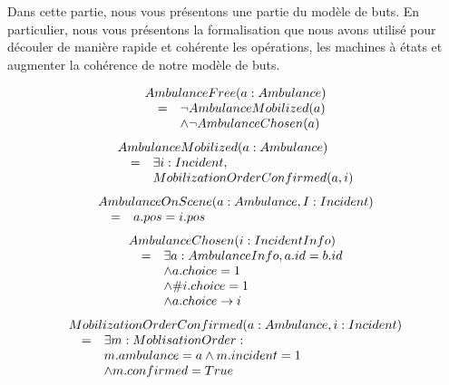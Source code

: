 Dans cette partie, nous vous présentons une partie du modèle de buts. En 
particulier, nous vous présentons la formalisation que nous avons
utilisé pour découler de manière rapide et cohérente les opérations, les
machines à états et augmenter la cohérence de notre modèle de buts.

\begin{equation*}
\begin{array}{rcl}
\multicolumn{3}{l}{AmbulanceFree(a: Ambulance)} \\ 
& = & \neg AmbulanceMobilized(a) \\
&   & \wedge \neg AmbulanceChosen(a) \\
\end{array}
\end{equation*}
\begin{equation*}
\begin{array}{rcl}
\multicolumn{3}{l}{AmbulanceMobilized(a: Ambulance)} \\ 
& = & \exists i:Incident, \\
&   & MobilizationOrderConfirmed(a, i) \\
\end{array}
\end{equation*}
\begin{equation*}
\begin{array}{rcl}
\multicolumn{3}{l}{AmbulanceOnScene(a:Ambulance, I:Incident)} \\ 
& = & a.pos = i.pos \\
\end{array}
\end{equation*}
\begin{equation*}
\begin{array}{rcl}
\multicolumn{3}{l}{AmbulanceChosen(i:IncidentInfo)} \\ 
& = & \exists a:AmbulanceInfo, a.id = b.id  \\
&   & \wedge a.choice = 1 \\
&   & \wedge \#i.choice = 1 \\
&   & \wedge a.choice \rightarrow i \\
\end{array}
\end{equation*}
\begin{equation*}
\begin{array}{rcl}
\multicolumn{3}{l}{MobilizationOrderConfirmed(a:Ambulance, i:Incident)} \\ 
& = & \exists m:MoblisationOrder: \\
&   & m.ambulance = a \wedge m.incident = 1 \\
&   & \wedge m.confirmed = True \\
\end{array}
\end{equation*}
